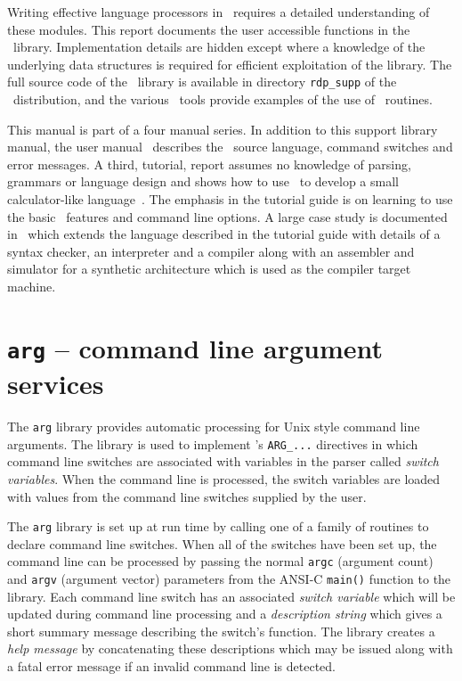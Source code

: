 Writing effective language processors in \rdp\
requires a detailed understanding of these modules.
This report documents the user accessible functions in the \rdpsupp\
library. Implementation details are hidden except where a knowledge of
the underlying data structures is required for efficient exploitation of
the library. The full source code of the \rdpsupp\ library is available
in directory \verb+rdp_supp+ of the \rdp\ distribution, and the various \rdp\ tools
provide examples of the use of \rdpsupp\ routines.

This manual is part of a four manual series. In addition to this support library 
manual, the user manual~\cite{rdp:user:1.5}
describes the \rdp\ source language, command switches and
error messages. A third, tutorial, report
assumes no knowledge of parsing, grammars or language design and shows
how to use \rdp\ to develop a small calculator-like
language~\cite{rdp:tut:1.5}. The emphasis in the tutorial guide is on
learning to use the basic \rdp\ features and command line options. A
large case study is documented in~\cite{rdp:case:1.5} which extends the
language described in the tutorial guide with details of a syntax
checker, an interpreter and a compiler along with an assembler and
simulator for a synthetic architecture which is used as the compiler
target machine.

\chapter{{\tt arg} -- command line argument services}

The {\tt arg} library provides automatic processing for Unix style
command line arguments. The library is used to implement \rdp's
\verb+ARG_...+ directives in which command line switches are associated
with variables in the parser called {\em switch variables}. When the command line
is processed, the switch variables are loaded with values from the command line
switches supplied by the user.

The {\tt arg} library is set up at run time by calling one of a family
of routines to  declare command line switches. When all of the switches
have been set up, the command line can be processed by passing the
normal \verb+argc+ (argument count) and \verb+argv+ (argument vector)
parameters from the ANSI-C {\tt main()} function to the library. Each
command line switch has an associated {\em switch variable} which will
be updated during command line processing and a {\em
description string} which gives a short summary message describing the
switch's function. The library creates a {\em help message} by
concatenating these descriptions which may be issued along with a fatal
error message if an invalid command line is detected.

